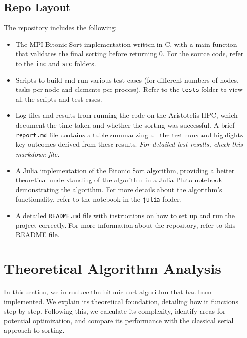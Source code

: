 \documentclass[12pt]{article}
\begin{document}
{\subsection*{Repo Layout} 
The repository includes the following:

\begin{itemize}[noitemsep]
    \item The MPI Bitonic Sort implementation written in C, with a main function that validates the final sorting before returning 0. For the source code, refer to the \texttt{inc} and \texttt{src} folders.
    \item Scripts to build and run various test cases (for different numbers of nodes, tasks per node and elements per process). Refer to the \texttt{tests} folder to view all the scripts and test cases.
    \item Log files and results from running the code on the Aristotelis HPC, which document the time taken and whether the sorting was successful. A brief \texttt{report.md} file contains a table summarizing all the test runs and highlights key outcomes derived from these results. \textit{For detailed test results, check this markdown file.}
    \item A Julia implementation of the Bitonic Sort algorithm, providing a better theoretical understanding of the algorithm in a Julia Pluto notebook demonstrating the algorithm. For more details about the algorithm’s functionality, refer to the notebook in the \texttt{julia} folder.
    \item A detailed \texttt{README.md} file with instructions on how to set up and run the project correctly. For more information about the repository, refer to this README file.
\end{itemize}

}

\pagestyle{fancy}
\chead{}

\section{Theoretical Algorithm Analysis}
In this section, we introduce the bitonic sort algorithm that has been implemented. We explain its theoretical foundation, detailing how it functions step-by-step. Following this, we calculate its complexity, identify areas for potential optimization, and compare its performance with the classical serial approach to sorting.
\end{document}
